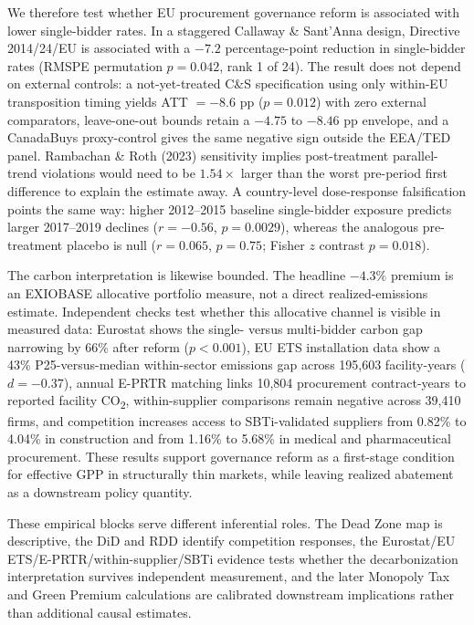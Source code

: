 \documentclass[11pt,a4paper]{article}
\begin{document}
We therefore test whether EU procurement governance reform is associated with lower single-bidder rates. In a staggered Callaway \& Sant'Anna design, Directive 2014/24/EU is associated with a $-7.2$ percentage-point reduction in single-bidder rates (RMSPE permutation $p = 0.042$, rank 1 of 24). The result does not depend on external controls: a not-yet-treated C\&S specification using only within-EU transposition timing yields ATT $= -8.6$ pp ($p = 0.012$) with zero external comparators, leave-one-out bounds retain a $-4.75$ to $-8.46$ pp envelope, and a CanadaBuys proxy-control gives the same negative sign outside the EEA/TED panel. Rambachan \& Roth (2023)\cite{rambachan2023} sensitivity implies post-treatment parallel-trend violations would need to be $1.54{\times}$ larger than the worst pre-period first difference to explain the estimate away. A country-level dose-response falsification points the same way: higher 2012--2015 baseline single-bidder exposure predicts larger 2017--2019 declines ($r = -0.56$, $p = 0.0029$), whereas the analogous pre-treatment placebo is null ($r = 0.065$, $p = 0.75$; Fisher $z$ contrast $p = 0.018$).

The carbon interpretation is likewise bounded. The headline $-4.3\%$ premium is an EXIOBASE allocative portfolio measure, not a direct realized-emissions estimate. Independent checks test whether this allocative channel is visible in measured data: Eurostat shows the single- versus multi-bidder carbon gap narrowing by 66\% after reform ($p < 0.001$), EU ETS installation data show a 43\% P25-versus-median within-sector emissions gap across 195,603 facility-years ($d = -0.37$), annual E-PRTR matching links 10,804 procurement contract-years to reported facility CO\textsubscript{2}, within-supplier comparisons remain negative across 39,410 firms, and competition increases access to SBTi-validated suppliers from 0.82\% to 4.04\% in construction and from 1.16\% to 5.68\% in medical and pharmaceutical procurement. These results support governance reform as a first-stage condition for effective GPP in structurally thin markets, while leaving realized abatement as a downstream policy quantity.

These empirical blocks serve different inferential roles. The Dead Zone map is descriptive, the DiD and RDD identify competition responses, the Eurostat/EU ETS/E-PRTR/within-supplier/SBTi evidence tests whether the decarbonization interpretation survives independent measurement, and the later Monopoly Tax and Green Premium calculations are calibrated downstream implications rather than additional causal estimates.
\end{document}
